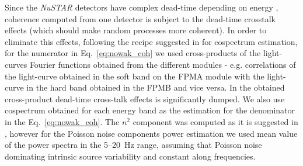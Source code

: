 \documentclass[a4paper,fleqn,usenatbib]{mnras}
\def\grs{{GRS\,1739--278\,}}
\begin{document}


Since the {\it NuSTAR} detectors have complex dead-time depending on energy \citep[see ][for a details on how this affects power spectra]{2015ApJ...800..109B}, coherence computed from one detector is subject to the dead-time crosstalk effects (which should make random processes more coherent).
In order to eliminate this effects, following the recipe suggested in \cite{2015ApJ...800..109B} for cospectrum estimation, for the numerator in Eq.~\ref{eq:nowak_coh} we used cross-products of the light-curves Fourier functions obtained from the different modules - e.g. correlations of the light-curve obtained in the soft band on the FPMA module with the light-curve in the hard band obtained in the FPMB and vice versa.
In the obtained cross-product dead-time cross-talk effects is significantly dumped.
We also use cospectrum obtained for each energy band as the estimation for the denominator in the Eq.~\ref{eq:nowak_coh}.
The $n^2$ component was computed as it is suggested in \citep{1997ApJ...474L..43V}, however for the Poisson noise components power estimation we used mean value of the power spectra in the 5--20~Hz range, assuming that Poisson noise dominating intrinsic source variability and constant along frequencies. 
\end{document}
